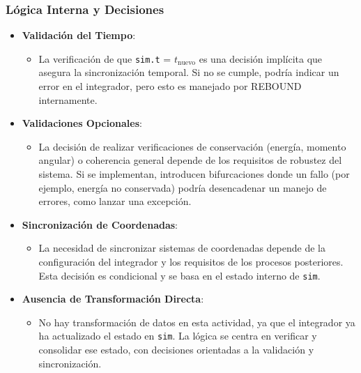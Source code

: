 \subsubsection{Lógica Interna y Decisiones}
\begin{itemize}
    \item \textbf{Validación del Tiempo}:
    \begin{itemize}
        \item La verificación de que \texttt{sim.t} = $t_{\text{nuevo}}$ es una decisión implícita que asegura la sincronización temporal. Si no se cumple, podría indicar un error en el integrador, pero esto es manejado por REBOUND internamente.
    \end{itemize}
    \item \textbf{Validaciones Opcionales}:
    \begin{itemize}
        \item La decisión de realizar verificaciones de conservación (energía, momento angular) o coherencia general depende de los requisitos de robustez del sistema. Si se implementan, introducen bifurcaciones donde un fallo (por ejemplo, energía no conservada) podría desencadenar un manejo de errores, como lanzar una excepción.
    \end{itemize}
    \item \textbf{Sincronización de Coordenadas}:
    \begin{itemize}
        \item La necesidad de sincronizar sistemas de coordenadas depende de la configuración del integrador y los requisitos de los procesos posteriores. Esta decisión es condicional y se basa en el estado interno de \texttt{sim}.
    \end{itemize}
    \item \textbf{Ausencia de Transformación Directa}:
    \begin{itemize}
        \item No hay transformación de datos en esta actividad, ya que el integrador ya ha actualizado el estado en \texttt{sim}. La lógica se centra en verificar y consolidar ese estado, con decisiones orientadas a la validación y sincronización.
    \end{itemize}
\end{itemize}


